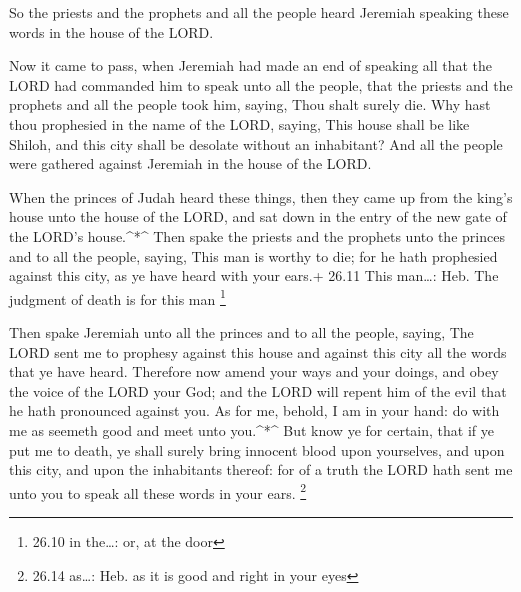  So the priests and the prophets and all the people heard
Jeremiah speaking these words in the house of the LORD.

 Now it came to pass, when Jeremiah had made an end of
speaking all that the LORD had commanded him to speak unto all the
people, that the priests and the prophets and all the people took him,
saying, Thou shalt surely die.  Why hast thou prophesied in
the name of the LORD, saying, This house shall be like Shiloh, and this
city shall be desolate without an inhabitant? And all the people were
gathered against Jeremiah in the house of the LORD.

 When the princes of Judah heard these things, then they
came up from the king's house unto the house of the LORD, and sat down
in the entry of the new gate of the LORD's house.\^{}*\^{} 
Then spake the priests and the prophets unto the princes and to all the
people, saying, This man is worthy to die; for he hath prophesied
against this city, as ye have heard with your ears.+ 26.11 This
man\ldots: Heb. The judgment of death is for this man \footnote{26.10 in
  the\ldots: or, at the door}

 Then spake Jeremiah unto all the princes and to all the
people, saying, The LORD sent me to prophesy against this house and
against this city all the words that ye have heard. 
Therefore now amend your ways and your doings, and obey the voice of the
LORD your God; and the LORD will repent him of the evil that he hath
pronounced against you.  As for me, behold, I am in your
hand: do with me as seemeth good and meet unto you.\^{}*\^{}
 But know ye for certain, that if ye put me to death, ye
shall surely bring innocent blood upon yourselves, and upon this city,
and upon the inhabitants thereof: for of a truth the LORD hath sent me
unto you to speak all these words in your ears. \footnote{26.14
  as\ldots: Heb. as it is good and right in your eyes}

